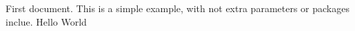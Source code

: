 \documentclass{article}
\begin{document}
First document. This is a simple example, with not extra parameters or packages
inclue. Hello World
\end{document}

